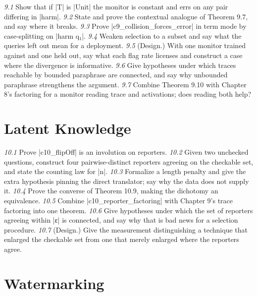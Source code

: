 \documentclass{memoir}
\begin{document}
\emph{9.1} Show that if \LeanVerb|T| is \LeanVerb|Unit| the monitor is constant and errs on any pair differing
in \LeanVerb|harm|.
\emph{9.2} State and prove the contextual analogue of Theorem 9.7, and say where it breaks.
\emph{9.3} Prove \LeanVerb|c9_collision_forces_error| in term mode by case-splitting on
\LeanVerb|harm q₁|.
\emph{9.4} Weaken selection to a subset and say what the queries left out mean for a
deployment.
\emph{9.5} (Design.) With one monitor trained against and one held out, say what each flag
rate licenses and construct a case where the divergence is informative.
\emph{9.6} Give hypotheses under which traces reachable by bounded paraphrase are connected,
and say why unbounded paraphrase strengthens the argument.
\emph{9.7} Combine Theorem 9.10 with Chapter 8's factoring for a monitor reading trace and
activations; does reading both help?



\section{Latent Knowledge}\label{Two--Schemas--of--Impossibility-005F-005F-005F--Machine--Checked--Limits--of--Trustworthy--Machine--Learning-005F-005F-005F--and--Why--They--Tighten--with--Capability----Exercises----Latent--Knowledge}

\emph{10.1} Prove \LeanVerb|c10_flipOff| is an involution on reporters.
\emph{10.2} Given two unchecked questions, construct four pairwise-distinct reporters
agreeing on the checkable set, and state the counting law for \LeanVerb|n|.
\emph{10.3} Formalize a length penalty and give the extra hypothesis pinning the direct
translator; say why the data does not supply it.
\emph{10.4} Prove the converse of Theorem 10.9, making the dichotomy an equivalence.
\emph{10.5} Combine \LeanVerb|c10_reporter_factoring| with Chapter 9's trace factoring into one
theorem.
\emph{10.6} Give hypotheses under which the set of reporters agreeing within \LeanVerb|ε| is
connected, and say why that is bad news for a selection procedure.
\emph{10.7} (Design.) Give the measurement distinguishing a technique that enlarged the
checkable set from one that merely enlarged where the reporters agree.



\section{Watermarking}\label{Two--Schemas--of--Impossibility-005F-005F-005F--Machine--Checked--Limits--of--Trustworthy--Machine--Learning-005F-005F-005F--and--Why--They--Tighten--with--Capability----Exercises----Watermarking}
\end{document}
